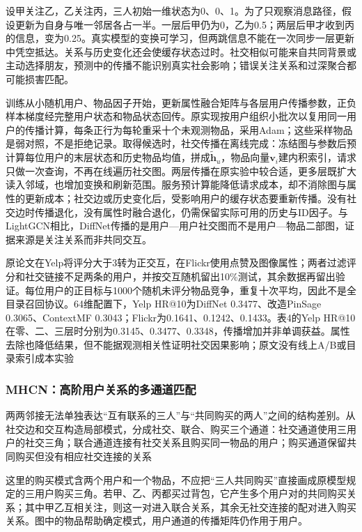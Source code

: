 设甲关注乙，乙关注丙，三人初始一维状态为0、0、1。为了只观察消息路径，假设更新为自身与唯一邻居各占一半。一层后甲仍为0，乙为0.5；两层后甲才收到丙的信息，变为0.25。真实模型的变换可学习，但两跳信息不能在一次同步一层更新中凭空抵达。关系与历史变化还会使缓存状态过时。社交相似可能来自共同背景或主动选择朋友，预测中的传播不能识别真实社会影响；错误关注关系和过深聚合都可能损害匹配。

训练从小随机用户、物品因子开始，更新属性融合矩阵与各层用户传播参数，正负样本梯度经完整用户状态和物品状态回传。原实现按用户组织小批次以复用同一用户的传播计算，每条正行为每轮重采十个未观测物品，采用Adam；这些采样物品是弱对照，不是拒绝记录。取得候选时，社交传播在离线完成：冻结图与参数后预计算每位用户的末层状态和历史物品均值，拼成$\widetilde{\bm h}_u$，物品向量$\bm v_i$建内积索引，请求只做一次查询，不再在线遍历社交图。两层传播在原实验中较合适，更多层既扩大读入邻域，也增加变换和刷新范围。服务预计算能降低请求成本，却不消除图与属性的更新成本；社交边或历史变化后，受影响用户的缓存状态要重新传播。没有社交边时传播退化，没有属性时融合退化，仍需保留实际可用的历史与ID因子。与LightGCN相比，DiffNet传播的是用户—用户社交图而不是用户—物品二部图，证据来源是关注关系而非共同交互。

原论文在Yelp将评分大于3转为正交互，在Flickr使用点赞及图像属性；两者过滤评分和社交链接不足两条的用户，并按交互随机留出10\%测试，其余数据再留出验证。每位用户的正目标与1000个随机未评分物品竞争，重复十次平均，因此不是全目录召回协议。64维配置下，Yelp HR@10为DiffNet 0.3477、改造PinSage 0.3065、ContextMF 0.3043；Flickr为0.1641、0.1242、0.1433。表4的Yelp HR@10在零、二、三层时分别为0.3145、0.3477、0.3348，传播增加并非单调获益。属性去除也降低结果，但不能据观测相关性证明社交因果影响；原文没有线上A/B或目录索引成本实验

\subsubsection{MHCN：高阶用户关系的多通道匹配}
\label{sec:rs-mhcn}

两两邻接无法单独表达“互有联系的三人”与“共同购买的两人”之间的结构差别。从社交边和交互构造局部模式，分成社交、联合、购买三个通道：社交通道使用三用户的社交三角；联合通道连接有社交关系且购买同一物品的用户；购买通道保留共同购买但没有相应社交连接的关系

这里的购买模式含两个用户和一个物品，不应把“三人共同购买”直接画成原模型规定的三用户购买三角。若甲、乙、丙都买过背包，它产生多个用户对的共同购买关系；其中甲乙互相关注，则这一对进入联合关系，其余无社交连接的配对进入购买关系。图中的物品帮助确定模式，用户通道的传播矩阵仍作用于用户。


